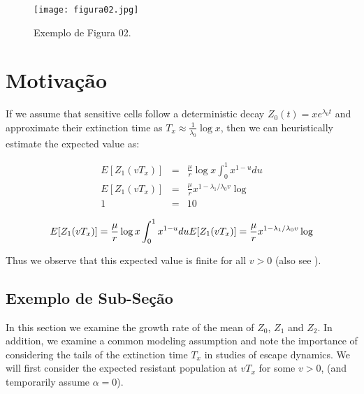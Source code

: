 \documentclass{classe_cn}                 %
\begin{document}
\begin{figure}[h!]
  \begin{center}
    \texttt{[image: figura02.jpg]}
    \caption{Exemplo de Figura 02.} 
    \label{tag_figura_02}
  \end{center}
\end{figure}

\section{Motivação}

If we assume that sensitive cells follow a deterministic decay $Z_0(t) = xe^{\lambda_0 t}$ and approximate their extinction time as $T_x \approx \frac{1}{\lambda_0} \log x$, then we can heuristically estimate the expected value as:

\begin{eqnarray}
\label{eqexpmuts}
  E [Z_1(vT_x)] &=& \frac{\mu}{r}\log x \int_0^{1} x^{1-u} du \\
  E [Z_1(vT_x)] &=& \frac{\mu}{r}x^{1-{\lambda_1}/{\lambda_0}v}\log  \\
  1 &=& 10
\end{eqnarray}

\begin{equation}
  E [Z_1(vT_x)] = \frac{\mu}{r}\log x \int_0^{1} x^{1-u} du \\
  E [Z_1(vT_x)] = \frac{\mu}{r}x^{1-{\lambda_1}/{\lambda_0}v}\log 
\end{equation}

Thus we observe that this expected value is finite for all $v>0$ (also see \cite{Rosenfeld:1970}).

\subsection{Exemplo de Sub-Seção}

In this section we examine the growth rate of the mean of $Z_0$, $Z_1$ and $Z_2$. In addition, we examine a common modeling assumption and note the importance of considering the tails of the extinction time $T_x$ in studies of escape dynamics. We will first consider the expected resistant population at $vT_x$ for some $v>0$, (and temporarily assume $\alpha=0$).
\end{document}

